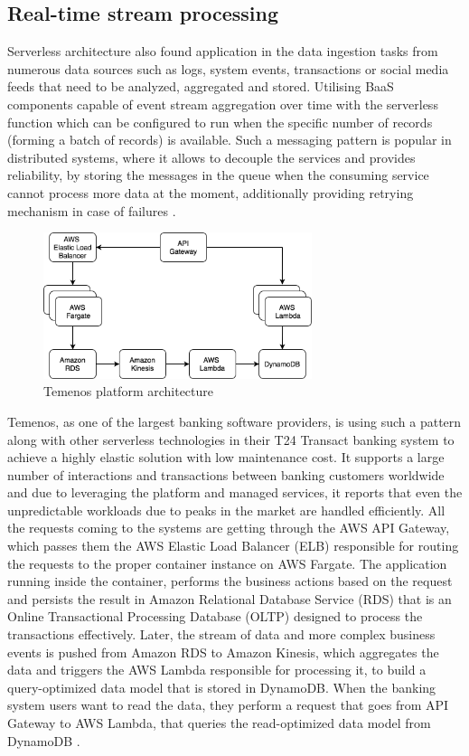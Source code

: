 \subsection{Real-time stream processing}

Serverless architecture also found application in the data ingestion tasks from numerous data sources such as logs, system events, transactions or social media feeds that need to be analyzed, aggregated and stored. Utilising BaaS components capable of event stream aggregation over time with the serverless function which can be configured to run when the specific number of records (forming a batch of records) is available. Such a messaging pattern is popular in distributed systems, where it allows to decouple the services and provides reliability, by storing the messages in the queue when the consuming service cannot process more data at the moment, additionally providing retrying mechanism in case of failures \cite{ServerlessArchitectureOnAWS}.

\begin{figure}[h]
    \centering
    \includegraphics[width=0.7\textwidth]{assets/02-serverless/TemenosArchitecture.png}
    \caption{Temenos platform architecture}
    \label{fig:temenos-architecture-diagram}
\end{figure}

Temenos, as one of the largest banking software providers, is using such a pattern along with other serverless technologies in their T24 Transact banking system to achieve a highly elastic solution with low maintenance cost. It supports a large number of interactions and transactions between banking customers worldwide and due to leveraging the platform and managed services, it reports that even the unpredictable workloads due to peaks in the market are handled efficiently. All the requests coming to the systems are getting through the AWS API Gateway, which passes them the AWS Elastic Load Balancer (ELB) responsible for routing the requests to the proper container instance on AWS Fargate. The application running inside the container, performs the business actions based on the request and persists the result in Amazon Relational Database Service (RDS) that is an Online Transactional Processing Database (OLTP) designed to process the transactions effectively. Later, the stream of data and more complex business events is pushed from Amazon RDS to Amazon Kinesis, which aggregates the data and triggers the AWS Lambda responsible for processing it, to build a query-optimized data model that is stored in DynamoDB. When the banking system users want to read the data, they perform a request that goes from API Gateway to AWS Lambda, that queries the read-optimized data model from DynamoDB \cite{ThisIsMyAchitectureTemenos}.

